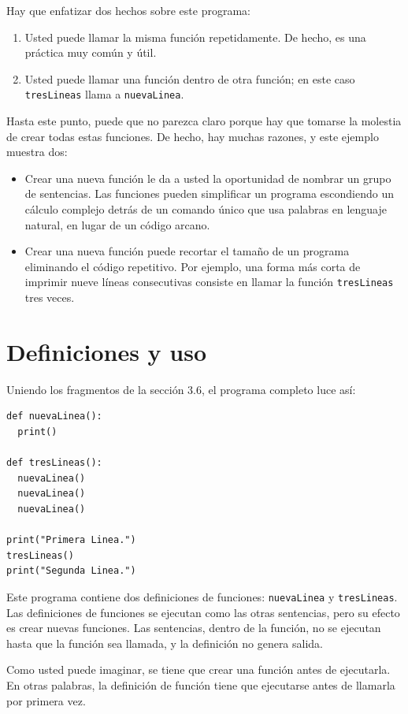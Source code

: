 Hay que enfatizar dos hechos sobre este programa:
\begin{enumerate}
\item Usted puede llamar la misma función repetidamente. De hecho, es una
práctica muy común y útil.
\item Usted puede llamar una función dentro de otra función; en este caso
\texttt{tresLineas} llama a \texttt{nuevaLinea}.
\end{enumerate}
Hasta este punto, puede que no parezca claro porque hay que tomarse
la molestia de crear todas estas funciones. De hecho, hay muchas razones,
y este ejemplo muestra dos:
\begin{itemize}
\item Crear una nueva función le da a usted la oportunidad de nombrar un
grupo de sentencias. Las funciones pueden simplificar un programa
escondiendo un cálculo complejo detrás de un comando único que usa
palabras en lenguaje natural, en lugar de un código arcano.
\item Crear una nueva función puede recortar el tamaño de un programa eliminando
el código repetitivo. Por ejemplo, una forma más corta de imprimir
nueve líneas consecutivas consiste en llamar la función \texttt{tresLineas}
tres veces.
\end{itemize}

\section{Definiciones y uso}

Uniendo los fragmentos de la sección 3.6, el programa completo luce
así:

\begin{verbatim}
def nuevaLinea():
  print()

def tresLineas():
  nuevaLinea()
  nuevaLinea()
  nuevaLinea()

print("Primera Linea.")
tresLineas()
print("Segunda Linea.")
\end{verbatim}
 Este programa contiene dos definiciones de funciones: \texttt{nuevaLinea}
y \texttt{tresLineas}. Las definiciones de funciones se ejecutan como
las otras sentencias, pero su efecto es crear nuevas funciones. Las
sentencias, dentro de la función, no se ejecutan hasta que la función
sea llamada, y la definición no genera salida.

Como usted puede imaginar, se tiene que crear una función antes de
ejecutarla. En otras palabras, la definición de función tiene que
ejecutarse antes de llamarla por primera vez.

